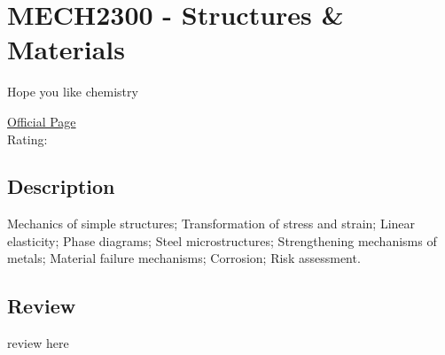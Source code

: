 \hypertarget{MECH2300}{\section{MECH2300 - Structures \& Materials}}
Hope you like chemistry

\large
\textcolor{turbo_purple}{\href{https://my.uq.edu.au/programs-courses/course.html?course_code=MECH2300}{Official Page}} \\
Rating: \cstar\cstar\cstar\cstar\ostar

\normalsize
\subsection*{Description}
Mechanics of simple structures; Transformation of stress and strain; Linear elasticity; Phase diagrams; Steel microstructures; Strengthening mechanisms of metals; Material failure mechanisms; Corrosion; Risk assessment.

\subsection*{Review}
review here
